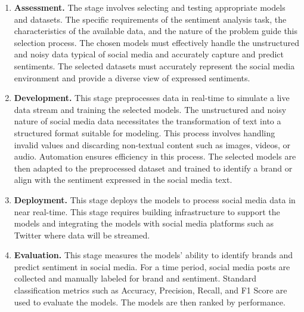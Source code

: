 \documentclass{article}
\begin{document}
\begin{enumerate}[leftmargin=*]

    \item \textbf{Assessment.} The stage involves selecting and testing
          appropriate models and datasets. The specific requirements of the sentiment
          analysis task, the characteristics of the available data, and the nature of the
          problem guide this selection process. The chosen models must effectively handle
          the unstructured and noisy data typical of social media and accurately capture
          and predict sentiments. The selected datasets must accurately represent the
          social media environment and provide a diverse view of expressed sentiments.

    \item \textbf{Development.} This stage preprocesses data in real-time to
          simulate a live data stream and training the selected models. The unstructured
          and noisy nature of social media data necessitates the transformation of text
          into a structured format suitable for modeling. This process involves handling
          invalid values and discarding non-textual content such as images, videos, or
          audio. Automation ensures efficiency in this process. The selected models are
          then adapted to the preprocessed dataset and trained to identify a brand or
          align with the sentiment expressed in the social media text.

    \item \textbf{Deployment.} This stage deploys the models to process social
          media data in near real-time. This stage requires building infrastructure to
          support the models and integrating the models with social media platforms such
          as Twitter where data will be streamed.

    \item \textbf{Evaluation.} This stage measures the models' ability to
          identify brands and predict sentiment in social media. For a time period,
          social media posts are collected and manually labeled for brand and sentiment.
          Standard classification metrics such as Accuracy, Precision, Recall, and F1
          Score are used to evaluate the models. The models are then ranked by
          performance.

\end{enumerate}
\end{document}
